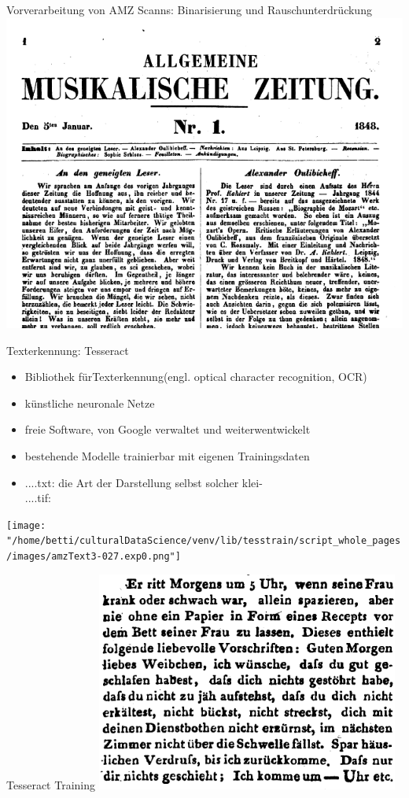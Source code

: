 \documentclass[aspectratio=169]{beamer}
\begin{document}
\begin{frame}{Vorverarbeitung von AMZ Scanns: Binarisierung und Rauschunterdrückung}
	\includegraphics[scale=.38]{"data/processed.png"}
\end{frame}
\begin{frame}{Texterkennung: Tesseract}
\begin{itemize}
		\item Bibliothek fürTexterkennung(engl. optical character recognition, OCR)
		\item künstliche neuronale Netze
		\item freie Software, von Google verwaltet und weiterwentwickelt
		\item bestehende Modelle trainierbar mit eigenen Trainingsdaten
		\item ....txt: \glqq  die Art der Darstellung selbst solcher klei-\grqq \\....tif:
	\end{itemize}
\texttt{[image: "/home/betti/culturalDataScience/venv/lib/tesstrain/script\_whole\_pages/images/amzText3-027.exp0.png"]}
\end{frame}
\begin{frame}{Tesseract Training}
	\includegraphics[scale=.6]{"data/tesseractmodelcomp.png"}
\end{frame}
\end{document}
